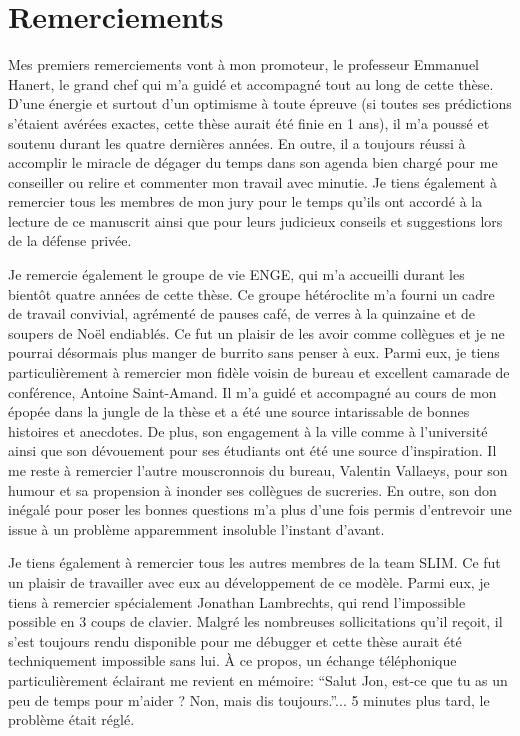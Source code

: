  \phantom{thanks}
\chapter*{Remerciements}

Mes premiers remerciements vont à mon promoteur, le professeur Emmanuel Hanert, le grand chef qui m'a guidé et accompagné tout au long de cette thèse. D'une énergie et surtout d'un optimisme à toute épreuve (si toutes ses prédictions s'étaient avérées exactes, cette thèse aurait été finie en 1 ans), il m’a poussé et soutenu durant les quatre dernières années. En outre, il a toujours réussi à accomplir le miracle de dégager du temps dans son agenda bien chargé pour me conseiller ou relire et commenter mon travail avec minutie. Je tiens également à remercier tous les membres de mon jury pour le temps qu'ils ont accordé à la lecture de ce manuscrit ainsi que pour leurs judicieux conseils et suggestions lors de la défense privée. 

Je remercie également le groupe de vie ENGE, qui m'a accueilli durant les bientôt quatre années de cette thèse. Ce groupe hétéroclite m'a fourni un cadre de travail convivial, agrémenté de pauses café, de verres à la quinzaine et de soupers de Noël endiablés. Ce fut un plaisir de les avoir comme collègues et je ne pourrai désormais plus manger de burrito sans penser à eux. Parmi eux, je tiens particulièrement à remercier mon fidèle voisin de bureau et excellent camarade de conférence, Antoine Saint-Amand. Il m'a guidé et accompagné au cours de mon épopée dans la jungle de la thèse et a été une source intarissable de bonnes histoires et anecdotes. De plus, son engagement à la ville comme à l’université ainsi que son dévouement pour ses étudiants ont été une source d’inspiration. Il me reste à remercier l’autre mouscronnois du bureau, Valentin Vallaeys, pour son humour et sa propension à inonder ses collègues de sucreries. En outre, son don inégalé pour poser les bonnes questions m'a plus d'une fois permis d’entrevoir une issue à un problème apparemment insoluble l’instant d’avant.

Je tiens également à remercier tous les autres membres de la team SLIM. Ce fut un plaisir de travailler avec eux au développement de ce modèle. Parmi eux, je tiens à remercier spécialement Jonathan Lambrechts, qui rend l’impossible possible en 3 coups de clavier. Malgré les nombreuses sollicitations qu’il reçoit, il s'est toujours rendu disponible pour me débugger et cette thèse aurait été techniquement impossible sans lui. À ce propos, un échange téléphonique particulièrement éclairant me revient en mémoire: “Salut Jon, est-ce que tu as un peu de temps pour m’aider ? Non, mais dis toujours.”... 5 minutes plus tard, le problème était réglé.

